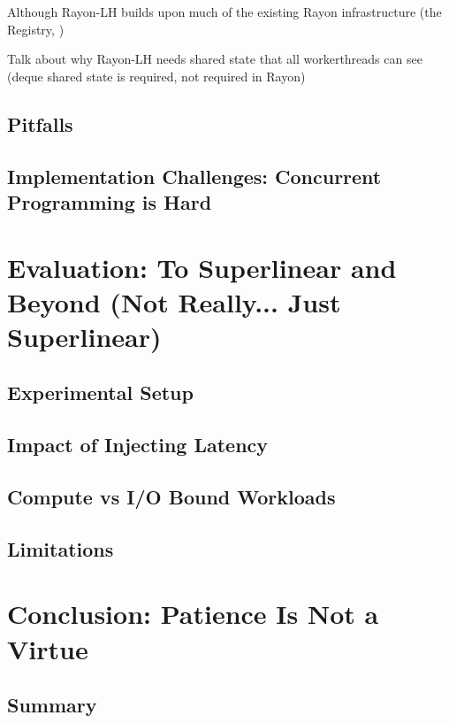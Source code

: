 \documentclass[bsc,frontabs,singlespacing,parskip,deptreport,normalheadings]{infthesis}
\begin{document}
Although Rayon-LH builds upon much of the existing Rayon infrastructure (the
Registry, )

Talk about why Rayon-LH needs shared state that all workerthreads can see (deque
shared state is required, not required in Rayon)

\section{Pitfalls}

\section{Implementation Challenges: Concurrent Programming is Hard}


\chapter{Evaluation: To Superlinear and Beyond (Not Really... Just Superlinear)}
\label{chapter:evaluation:_to_superlinear_and_beyond_(not_really..._just_superlinear)}

\section{Experimental Setup}

\section{Impact of Injecting Latency}

\section{Compute vs I/O Bound Workloads}

\section{Limitations}


\chapter{Conclusion: Patience Is Not a Virtue}

\section{Summary}
\end{document}
